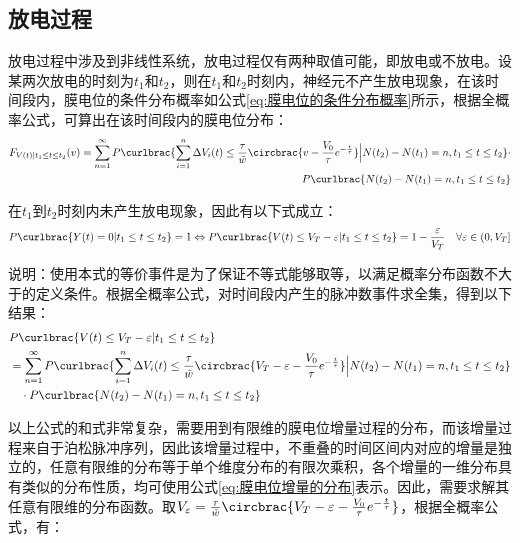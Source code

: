 \documentclass[11pt]{article}
\begin{document}
\subsection{放电过程}
放电过程中涉及到非线性系统，放电过程仅有两种取值可能，即放电或不放电。设某两次放电的时刻为$t_1$和$t_2$，则在$t_1$和$t_2$时刻内，神经元不产生放电现象，在该时间段内，膜电位的条件分布概率如公式\ref{eq:膜电位的条件分布概率}所示，根据全概率公式，可算出在该时间段内的膜电位分布：
\begin{align}
  \begin{aligned}
    F_{V(t)|t_1\le t\le t_2}(v)=    \sum_{n=1}^{\infty}P\curlbrac{\sum_{i=1}^{n}\Delta V_i(t)\le \frac{\tau}{\tilde{w}}\circbrac{v-\frac{V_0}{\tau}e^{-\frac{t}{\tau}}}\Big| N(t_2)-N(t_1)=n,t_1\le t\le t_2}\cdot \\
    P\curlbrac{ N(t_2)-N(t_1)=n,t_1\le t\le t_2}
  \end{aligned}
\end{align}\par
在$t_1$到$t_2$时刻内未产生放电现象，因此有以下式成立：
\begin{align*}
  P\curlbrac{Y(t)=0|t_1\le t\le t_2}=1\Leftrightarrow  P\curlbrac{V(t)\le V_T-\varepsilon|t_1\le t\le t_2}=1-\frac{\varepsilon }{V_T}\quad\forall\varepsilon\in(0, V_T]
\end{align*}\par
说明：使用本式的等价事件是为了保证不等式能够取等，以满足概率分布函数不大于的定义条件。根据全概率公式，对时间段内产生的脉冲数事件求全集，得到以下结果：
\begin{align}
  \begin{aligned}
     & P\curlbrac{V(t)\le V_T-\varepsilon|t_1\le t\le t_2} \\&=\sum_{n=1}^{\infty}P\curlbrac{\sum_{i=1}^{n}\Delta V_i(t)\le \frac{\tau}{\tilde{w}}\circbrac{V_T-\varepsilon-\frac{V_0}{\tau}e^{-\frac{t}{\tau}}}\Big| N(t_2)-N(t_1)=n,t_1\le t\le t_2}\\
     &\quad\cdot  P\curlbrac{ N(t_2)-N(t_1)=n,t_1\le t\le t_2}        \\
  \end{aligned}
\end{align}\par
以上公式的和式非常复杂，需要用到有限维的膜电位增量过程的分布，而该增量过程来自于泊松脉冲序列，因此该增量过程中，不重叠的时间区间内对应的增量是独立的，任意有限维的分布等于单个维度分布的有限次乘积，各个增量的一维分布具有类似的分布性质，均可使用公式\ref{eq:膜电位增量的分布}表示。因此，需要求解其任意有限维的分布函数。取$V_\varepsilon=\frac{\tau}{\tilde{w}}\circbrac{V_T-\varepsilon-\frac{V_0}{\tau}e^{-\frac{t}{\tau}}}$，根据全概率公式，有：\par
\end{document}
